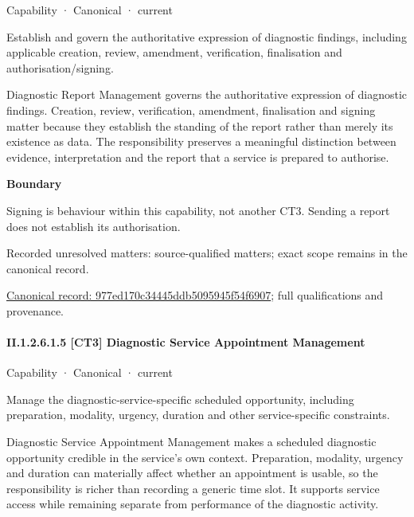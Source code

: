 \label{element:977ed170c34445ddb5095945f54f6907}
{\small Capability · Canonical · current}\par

Establish and govern the authoritative expression of diagnostic findings, including applicable creation, review, amendment, verification, finalisation and authorisation/signing.



Diagnostic Report Management governs the authoritative expression of diagnostic findings. Creation, review, verification, amendment, finalisation and signing matter because they establish the standing of the report rather than merely its existence as data. The responsibility preserves a meaningful distinction between evidence, interpretation and the report that a service is prepared to authorise.



\textbf{Boundary}



Signing is behaviour within this capability, not another CT3. Sending a report does not establish its authorisation.


{\small Recorded unresolved matters: source-qualified matters; exact scope remains in the canonical record.}\par
{\footnotesize \href{../../../../continuum/strategy/capability/977ed170c34445ddb5095945f54f6907.md}{Canonical record: 977ed170c34445ddb5095945f54f6907}; full qualifications and provenance.}\par
\paragraph*{II.1.2.6.1.5 [CT3] Diagnostic Service Appointment Management}
\label{navigation:II.1.2.6.1.5}

\label{element:5410a0275dfa4460ad49100fa5a2f2ec}
{\small Capability · Canonical · current}\par

Manage the diagnostic-service-specific scheduled opportunity, including preparation, modality, urgency, duration and other service-specific constraints.



Diagnostic Service Appointment Management makes a scheduled diagnostic opportunity credible in the service's own context. Preparation, modality, urgency and duration can materially affect whether an appointment is usable, so the responsibility is richer than recording a generic time slot. It supports service access while remaining separate from performance of the diagnostic activity.



